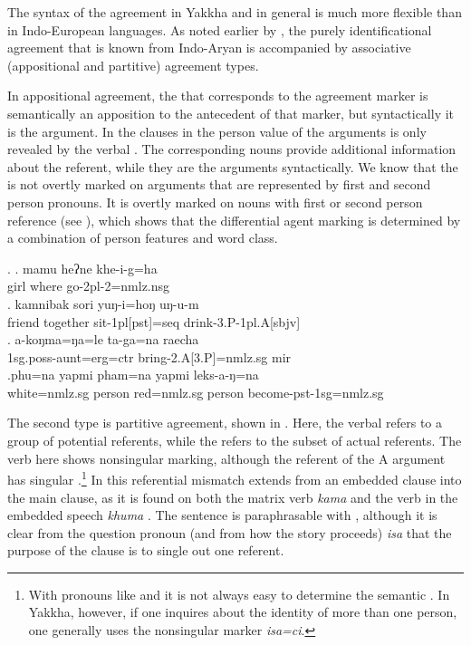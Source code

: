 The syntax of the agreement in Yakkha and  in general is much more flexible than in Indo-European languages. As noted earlier by \cite{Bickel2000On-the-syntax}, the purely identificational agreement that is known from Indo-Aryan is accompanied by associative (appositional and partitive) agreement types. 

In appositional agreement, the  that corresponds to the agreement marker is semantically an apposition to the antecedent of that marker, but syntactically it is the argument. In the clauses in \Next the person value of the arguments is only revealed by the verbal . The corresponding nouns provide additional information about the referent, while  they are the arguments syntactically. We know that the   is not overtly marked on arguments that are represented by first and second person pronouns. It is overtly marked on nouns with first or second person reference (see \Next[c]), which shows that the differential agent marking is determined by a combination of person features and word class.

\ex.  \ag. mamu heʔne khe-i-g=ha\label{verb-infl-example}\\
		girl where go{\sc [pst]-2pl-2=nmlz.nsg}\\
	\bg.  kamnibak sori yuŋ-i=hoŋ uŋ-u-m\\
		friend together sit{\sc -1pl[pst]=seq} drink{\sc -3.P-1pl.A[sbjv]}\\
	\bg. a-koŋma=ŋa=le   ta-ga=na           raecha\\
		{\sc 1sg.poss-}aunt{\sc =erg=ctr} bring{\sc [pst]-2.A[3.P]=nmlz.sg} {\sc mir} \\
		 
		\bg.phu=na yapmi pham=na yapmi leks-a-ŋ=na\\
		white{\sc =nmlz.sg} person red{\sc =nmlz.sg} person become{\sc -pst-1sg=nmlz.sg}\\
 
 
 The second type is partitive agreement, shown in \Next. Here, the verbal  refers to a group of potential referents, while the  refers to the subset of actual referents. The verb here shows nonsingular  marking, although the referent of the A argument has singular .\footnote{With pronouns like  and  it is not always easy to determine the semantic . In Yakkha, however, if one inquires about the identity of more than one person, one generally uses the nonsingular marker \emph{isa=ci}.}  In \Next[b] this referential mismatch extends from an embedded clause into the main clause, as it is found on both the matrix verb \emph{kama}  and the verb in the embedded speech \emph{khuma} . The sentence is paraphrasable with , although it is clear from the question pronoun (and from how the story proceeds) \emph{isa}  that the purpose of the clause is to single out one referent.
  
